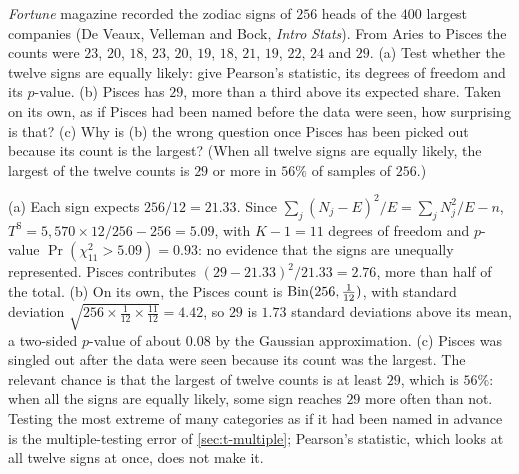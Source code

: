 \begin{exercise}
\label{ex:gof-zodiac}
\textit{Fortune} magazine recorded the zodiac signs of $256$ heads of the $400$ largest companies (De Veaux, Velleman and Bock, \textit{Intro Stats}). From Aries to Pisces the counts were $23$, $20$, $18$, $23$, $20$, $19$, $18$, $21$, $19$, $22$, $24$ and $29$. (a) Test whether the twelve signs are equally likely: give Pearson's statistic, its degrees of freedom and its $p$-value. (b) Pisces has $29$, more than a third above its expected share. Taken on its own, as if Pisces had been named before the data were seen, how surprising is that? (c) Why is (b) the wrong question once Pisces has been picked out because its count is the largest? (When all twelve signs are equally likely, the largest of the twelve counts is $29$ or more in $56\%$ of samples of $256$.)
\end{exercise}
\begin{solution}
(a) Each sign expects $256/12 = 21.33$. Since $\sum_j(N_j - E)^2/E = \sum_jN_j^2/E - n$, $T^{\mathrm{S}} = 5{,}570 \times 12/256 - 256 = 5.09$, with $K - 1 = 11$ degrees of freedom and $p$-value $\Pr(\chi^2_{11} > 5.09) = 0.93$: no evidence that the signs are unequally represented. Pisces contributes $(29 - 21.33)^2/21.33 = 2.76$, more than half of the total. (b) On its own, the Pisces count is $\mathrm{Bin}(256, \frac{1}{12})$, with standard deviation $\sqrt{256 \times \frac{1}{12} \times \frac{11}{12}} = 4.42$, so $29$ is $1.73$ standard deviations above its mean, a two-sided $p$-value of about $0.08$ by the Gaussian approximation. (c) Pisces was singled out after the data were seen because its count was the largest. The relevant chance is that the largest of twelve counts is at least $29$, which is $56\%$: when all the signs are equally likely, some sign reaches $29$ more often than not. Testing the most extreme of many categories as if it had been named in advance is the multiple-testing error of \cref{sec:t-multiple}; Pearson's statistic, which looks at all twelve signs at once, does not make it.
\end{solution}

